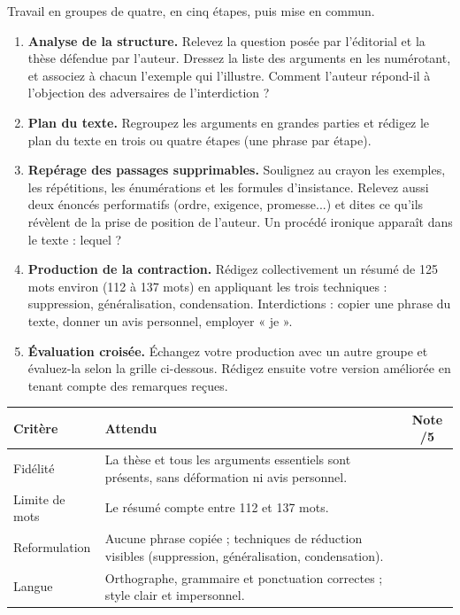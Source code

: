 \documentclass[11pt]{article}
\newcounter{popsec}
\newcounter{popsub}
\newcommand{\courssub}[1]{%
  \stepcounter{popsub}%
  \par\vspace{9pt}\noindent{\popxbold\fontsize{11.5}{13}\selectfont\color{popink}{\color{poporange}\thepopsec.\thepopsub}\hspace{6pt}#1}\par\nopagebreak\vspace{4pt}
}
\begin{document}
\courssub{Consignes}

Travail en groupes de quatre, en cinq étapes, puis mise en commun.

\begin{enumerate}
\item \textbf{Analyse de la structure.} Relevez la question posée par l'éditorial et la thèse défendue par l'auteur. Dressez la liste des arguments en les numérotant, et associez à chacun l'exemple qui l'illustre. Comment l'auteur répond-il à l'objection des adversaires de l'interdiction ?
\item \textbf{Plan du texte.} Regroupez les arguments en grandes parties et rédigez le plan du texte en trois ou quatre étapes (une phrase par étape).
\item \textbf{Repérage des passages supprimables.} Soulignez au crayon les exemples, les répétitions, les énumérations et les formules d'insistance. Relevez aussi deux énoncés performatifs (ordre, exigence, promesse...) et dites ce qu'ils révèlent de la prise de position de l'auteur. Un procédé ironique apparaît dans le texte : lequel ?
\item \textbf{Production de la contraction.} Rédigez collectivement un résumé de 125 mots environ (112 à 137 mots) en appliquant les trois techniques : suppression, généralisation, condensation. Interdictions : copier une phrase du texte, donner un avis personnel, employer « je ».
\item \textbf{Évaluation croisée.} Échangez votre production avec un autre groupe et évaluez-la selon la grille ci-dessous. Rédigez ensuite votre version améliorée en tenant compte des remarques reçues.
\end{enumerate}

\begin{center}
\begin{tabularx}{\linewidth}{|l|X|c|}
\hline
\rowcolor{popblueL} \textbf{Critère} & \textbf{Attendu} & \textbf{Note /5} \\
\hline
Fidélité & La thèse et tous les arguments essentiels sont présents, sans déformation ni avis personnel. & \\
\hline
Limite de mots & Le résumé compte entre 112 et 137 mots. & \\
\hline
Reformulation & Aucune phrase copiée ; techniques de réduction visibles (suppression, généralisation, condensation). & \\
\hline
Langue & Orthographe, grammaire et ponctuation correctes ; style clair et impersonnel. & \\
\hline
\end{tabularx}
\end{center}
\end{document}
